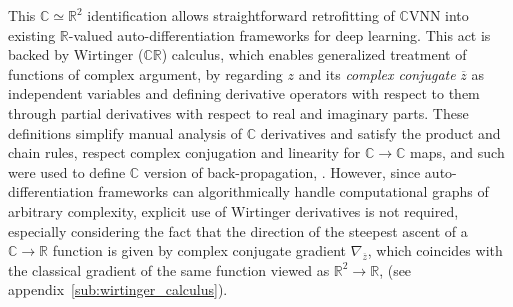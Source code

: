 \documentclass[a4paper,10pt,twocolumn]{article}
\newcommand{\real}{\mathbb{R}}
\newcommand{\cplx}{\mathbb{C}}
\newcommand{\conj}[1]{\overline{#1}}
\begin{document}
This $\cplx \simeq \real^2$ identification allows straightforward retrofitting of $\cplx$VNN
into existing $\real$-valued auto-differentiation frameworks for deep learning. This
act is backed by Wirtinger ($\cplx\real$) calculus, which enables generalized treatment
of functions of complex argument, by regarding $z$ and its \emph{complex conjugate}
$\conj{z}$ as independent variables and defining derivative operators with respect to
them through partial derivatives with respect to real and imaginary parts. These definitions
simplify manual analysis of $\cplx$ derivatives and satisfy the product and chain rules, respect
complex conjugation and linearity for $\cplx \to \cplx$ maps, and such were used to define
$\cplx$ version of back-propagation, \citep{benvenuto_complex_1992,guberman_complex_2016}.
However, since auto-differentiation frameworks can algorithmically handle computational
graphs of arbitrary complexity, explicit use of Wirtinger derivatives is not required,
especially considering the fact that the direction of the steepest ascent of a $
  \cplx \to \real
$ function is given by complex conjugate gradient $\nabla_{\conj{z}}$, which coincides
with the classical gradient of the same function viewed as $\real^2 \to \real$,
(see appendix~\ref{sub:wirtinger_calculus}).
%
%
%
\end{document}
